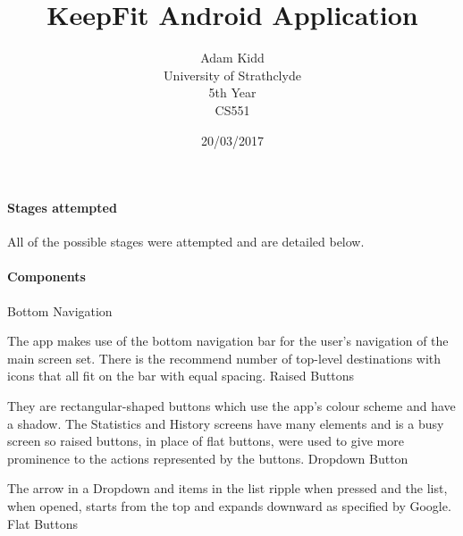 \documentclass[12pt]{report}
\title{KeepFit Android Application}
\author {Adam Kidd\\
	University of Strathclyde\\
	5th Year\\
	CS551}
\date{20/03/2017}
\begin{document}
\maketitle





\chapter{}


\subsubsection{Stages attempted}

All of the possible stages were attempted and are detailed below.

\subsubsection{Components}

Bottom Navigation

The app makes use of the bottom navigation bar for the user's navigation of the main screen set. There is the recommend number of top-level destinations with icons that all fit on the bar with equal spacing. 
\newline
\newline
Raised Buttons

They are rectangular-shaped buttons which use the app’s colour scheme and have a shadow. The Statistics and History screens have many elements and is a busy screen so raised buttons, in place of flat buttons, were used to give more prominence to the actions represented by the buttons. 
\newline
\newline
Dropdown Button

The arrow in a Dropdown and items in the list ripple when pressed and the list, when opened, starts from the top and expands downward as specified by Google.
\newline
\newline
Flat Buttons 
\end{document}
